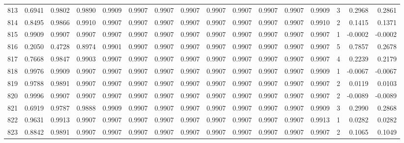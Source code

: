 \begin{tabular}{lrrrrrrrrrrrrrrr}
813 &      0.6941 &  0.9802 &  0.9890 &  0.9909 &  0.9907 &  0.9907 &  0.9907 &  0.9907 &  0.9907 &  0.9907 &   0.9907 &     0.9909 &      3 &                    0.2968 &                     0.2861 \\
814 &      0.8495 &  0.9866 &  0.9910 &  0.9907 &  0.9907 &  0.9907 &  0.9907 &  0.9907 &  0.9907 &  0.9907 &   0.9907 &     0.9910 &      2 &                    0.1415 &                     0.1371 \\
815 &      0.9909 &  0.9907 &  0.9907 &  0.9907 &  0.9907 &  0.9907 &  0.9907 &  0.9907 &  0.9907 &  0.9907 &   0.9907 &     0.9907 &      1 &                   -0.0002 &                    -0.0002 \\
816 &      0.2050 &  0.4728 &  0.8974 &  0.9901 &  0.9907 &  0.9907 &  0.9907 &  0.9907 &  0.9907 &  0.9907 &   0.9907 &     0.9907 &      5 &                    0.7857 &                     0.2678 \\
817 &      0.7668 &  0.9847 &  0.9903 &  0.9907 &  0.9907 &  0.9907 &  0.9907 &  0.9907 &  0.9907 &  0.9907 &   0.9907 &     0.9907 &      4 &                    0.2239 &                     0.2179 \\
818 &      0.9976 &  0.9909 &  0.9907 &  0.9907 &  0.9907 &  0.9907 &  0.9907 &  0.9907 &  0.9907 &  0.9907 &   0.9907 &     0.9909 &      1 &                   -0.0067 &                    -0.0067 \\
819 &      0.9788 &  0.9891 &  0.9907 &  0.9907 &  0.9907 &  0.9907 &  0.9907 &  0.9907 &  0.9907 &  0.9907 &   0.9907 &     0.9907 &      2 &                    0.0119 &                     0.0103 \\
820 &      0.9996 &  0.9907 &  0.9907 &  0.9907 &  0.9907 &  0.9907 &  0.9907 &  0.9907 &  0.9907 &  0.9907 &   0.9907 &     0.9907 &      2 &                   -0.0089 &                    -0.0089 \\
821 &      0.6919 &  0.9787 &  0.9888 &  0.9909 &  0.9907 &  0.9907 &  0.9907 &  0.9907 &  0.9907 &  0.9907 &   0.9907 &     0.9909 &      3 &                    0.2990 &                     0.2868 \\
822 &      0.9631 &  0.9913 &  0.9907 &  0.9907 &  0.9907 &  0.9907 &  0.9907 &  0.9907 &  0.9907 &  0.9907 &   0.9907 &     0.9913 &      1 &                    0.0282 &                     0.0282 \\
823 &      0.8842 &  0.9891 &  0.9907 &  0.9907 &  0.9907 &  0.9907 &  0.9907 &  0.9907 &  0.9907 &  0.9907 &   0.9907 &     0.9907 &      2 &                    0.1065 &                     0.1049 \\

\end{tabular}
